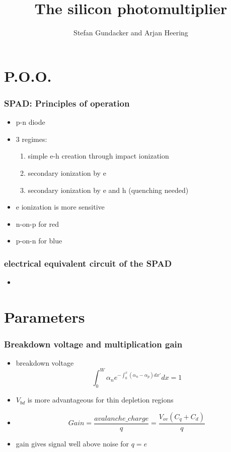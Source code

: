 \documentclass{beamer}
\title{The silicon photomultiplier}
\author{Stefan Gundacker and Arjan Heering}
\institute{Presented: by Yannick Prianon,\\ Jonas Berggren, Anna Dunz}
\begin{document}



\begin{frame}
\titlepage
\end{frame}

\section{P.O.O.}
\begin{frame}
\frametitle{SPAD: Principles of operation}
  \begin{itemize}
    \item p-n diode
    \item 3 regimes:
    \begin{enumerate}
      \item simple e-h creation through impact ionization
      \item secondary ionization by e
      \item secondary ionization by e and h (quenching needed)
    \end{enumerate}
    \item e ionization is more sensitive
    \item n-on-p for red
    \item p-on-n for blue
  \end{itemize}
\end{frame}

\begin{frame}
  \frametitle{electrical equivalent circuit of the SPAD}
  \begin{itemize}
    \item 
  \end{itemize}
\end{frame}

\section{Parameters}
\begin{frame}
  \frametitle{Breakdown voltage and multiplication gain}
  \begin{itemize}
    \item breakdown voltage
      \[\int_0^W\alpha_ne^{-\int_0^x(\alpha_n-\alpha_p)dx'}dx=1\]
    \item $V_{bd}$ is more advantageous for thin depletion regions
    \item
      \[Gain=\frac{avalanche\_charge}{q}=\frac{V_{ov}(C_q+C_d)}{q}\]
    \item gain gives signal well above noise for $q=e$
  \end{itemize}
\end{frame}
\end{document}
